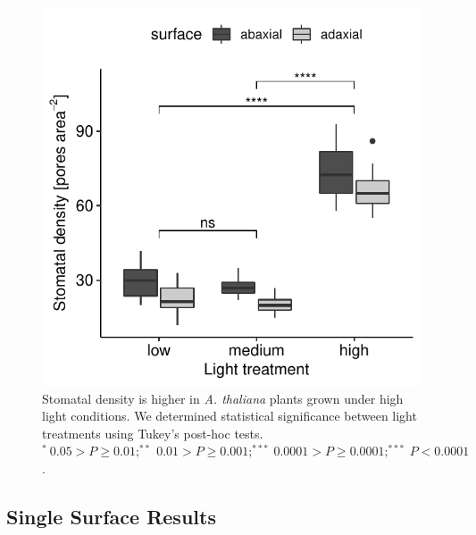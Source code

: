 \documentclass[12pt,halfline,a4paper,]{ouparticle}
\begin{document}
\begin{figure}[ht]
\includegraphics[width = \textwidth]{figures/density.pdf}
\caption{Stomatal density is higher in \textit{A. thaliana} plants grown under high light conditions. We determined statistical significance between light treatments using Tukey's post-hoc tests. $^*~0.05 > P \ge 0.01; ^{**}~0.01 > P \ge 0.001; ^{***}~0.0001 > P \ge 0.0001; ^{***}~ P <0.0001$.}
\label{fig:density}
\end{figure}

\hypertarget{single-surface-results}{%
\subsection{Single Surface Results}\label{single-surface-results}}
\end{document}
